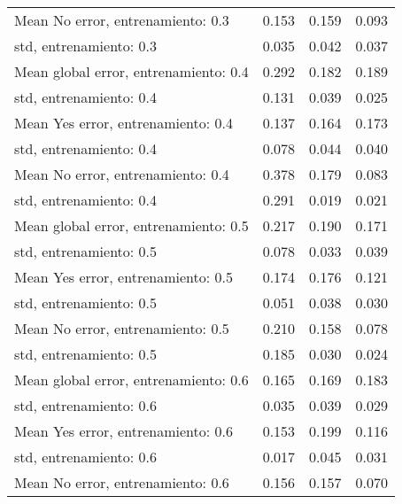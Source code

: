 \begin{longtable}{p{4cm}|p{1.5cm}|p{1.5cm}|p{1.5cm}}
Mean No error, entrenamiento: 0.3     &        0.153 &     0.159 &                        0.093 \\
std, entrenamiento: 0.3               &        0.035 &     0.042 &                        0.037 \\
Mean global error, entrenamiento: 0.4 &        0.292 &     0.182 &                        0.189 \\
std, entrenamiento: 0.4               &        0.131 &     0.039 &                        0.025 \\
Mean Yes error, entrenamiento: 0.4    &        0.137 &     0.164 &                        0.173 \\
std, entrenamiento: 0.4               &        0.078 &     0.044 &                        0.040 \\
Mean No error, entrenamiento: 0.4     &        0.378 &     0.179 &                        0.083 \\
std, entrenamiento: 0.4               &        0.291 &     0.019 &                        0.021 \\
Mean global error, entrenamiento: 0.5 &        0.217 &     0.190 &                        0.171 \\
std, entrenamiento: 0.5               &        0.078 &     0.033 &                        0.039 \\
Mean Yes error, entrenamiento: 0.5    &        0.174 &     0.176 &                        0.121 \\
std, entrenamiento: 0.5               &        0.051 &     0.038 &                        0.030 \\
Mean No error, entrenamiento: 0.5     &        0.210 &     0.158 &                        0.078 \\
std, entrenamiento: 0.5               &        0.185 &     0.030 &                        0.024 \\
Mean global error, entrenamiento: 0.6 &        0.165 &     0.169 &                        0.183 \\
std, entrenamiento: 0.6               &        0.035 &     0.039 &                        0.029 \\
Mean Yes error, entrenamiento: 0.6    &        0.153 &     0.199 &                        0.116 \\
std, entrenamiento: 0.6               &        0.017 &     0.045 &                        0.031 \\
Mean No error, entrenamiento: 0.6     &        0.156 &     0.157 &                        0.070 \\

\end{longtable}
